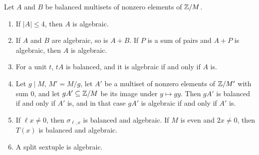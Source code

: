 \begin{lemma}\label{lem:algtools}
Let $A$ and $B$ be balanced multisets of nonzero elements of $\mathbb{Z}/M$.
\begin{enumerate}[label=\textup{(\alph*)}]
\item If $|A|\le4$, then $A$ is algebraic.
\item If $A$ and $B$ are algebraic, so is $A+B$. If $P$ is a sum of pairs and
$A+P$ is algebraic, then $A$ is algebraic.
\item For a unit $t$, $tA$ is balanced, and it is algebraic if and only if
$A$ is.
\item Let $g\mid M$, $M'=M/g$, let $A'$ be a multiset of nonzero elements of
$\mathbb{Z}/M'$ with sum $0$, and let $gA'\subseteq\mathbb{Z}/M$ be its image under
$y\mapsto gy$. Then $gA'$ is balanced if and only if $A'$ is, and in that
case $gA'$ is algebraic if and only if $A'$ is.
\item If $\ell x\ne0$, then $\sigma_{\ell,x}$ is balanced and algebraic. If
$M$ is even and $2x\ne0$, then $T(x)$ is balanced and algebraic.
\item A split sextuple is algebraic.
\end{enumerate}
\end{lemma}

